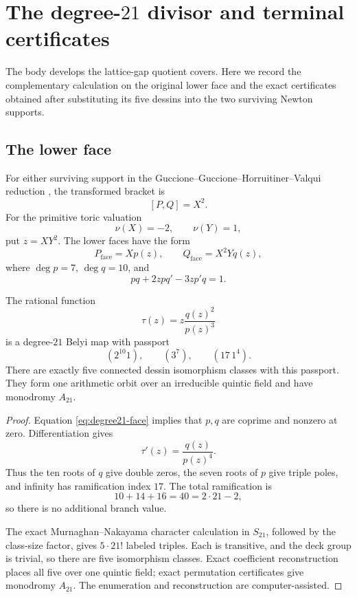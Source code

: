 \section{The degree-\(21\) divisor and terminal certificates}
\label{app:degree-twenty-one}

The body develops the lattice-gap quotient covers.  Here we record the
complementary calculation on the original lower face and the exact
certificates obtained after substituting its five dessins into the two
surviving Newton supports.

\subsection{The lower face}

For either surviving support in the Guccione--Guccione--Horruitiner--Valqui
reduction \cite{guccioneEtAl2022degree108}, the transformed bracket is
\[
[P,Q]=X^2.
\]
For the primitive toric valuation
\[
\nu(X)=-2,\qquad \nu(Y)=1,
\]
put \(z=XY^2\).  The lower faces have the form
\[
P_{\mathrm{face}}=Xp(z),\qquad
Q_{\mathrm{face}}=X^2Yq(z),
\]
where \(\deg p=7\), \(\deg q=10\), and
\begin{equation}
\label{eq:degree21-face}
pq+2zpq'-3zp'q=1.
\end{equation}

\begin{proposition}
\label{prop:degree21-belyi}
The rational function
\[
\tau(z)=z\frac{q(z)^2}{p(z)^3}
\]
is a degree-\(21\) Belyi map with passport
\[
(2^{10}1),\qquad(3^7),\qquad(17\,1^4).
\]
There are exactly five connected dessin isomorphism classes with this
passport.  They form one arithmetic orbit over an irreducible quintic field
and have monodromy \(A_{21}\).
\end{proposition}

\begin{proof}
Equation \eqref{eq:degree21-face} implies that \(p,q\) are coprime and
nonzero at zero.  Differentiation gives
\[
\tau'(z)=\frac{q(z)}{p(z)^4}.
\]
Thus the ten roots of \(q\) give double zeros, the seven roots of \(p\)
give triple poles, and infinity has ramification index \(17\).  The total
ramification is
\[
10+14+16=40=2\cdot21-2,
\]
so there is no additional branch value.

The exact Murnaghan--Nakayama character calculation in \(S_{21}\), followed
by the class-size factor, gives \(5\cdot21!\) labeled triples.  Each is
transitive, and the deck group is trivial, so there are five isomorphism
classes.  Exact coefficient reconstruction places all five over one
quintic field; exact permutation certificates give monodromy \(A_{21}\).
The enumeration and reconstruction are computer-assisted.
\end{proof}

